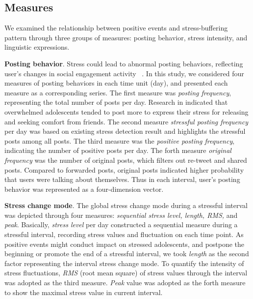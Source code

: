 \subsection{Measures}
\label{measures}
We examined the relationship
between positive events and stress-buffering pattern through three groups of measures:
posting behavior, stress intensity, and linguistic expressions.

\textbf{Posting behavior}.
Stress could lead to abnormal posting behaviors,
reflecting user's changes in social engagement activity ~\citep{Liang2015Teenagers}.
In this study,
we considered four measures of posting behaviors in each time unit (day),
and presented each measure as a corresponding series.
The first measure was \emph{posting frequency},
representing the total number of posts per day.
Research in \cite{Li2017Analyzing} indicated that overwhelmed adolescents tended to post more to express their stress for releasing
and seeking comfort from friends.
The second measure \emph{stressful posting frequency} per day
was based on existing stress detection result and highlights the stressful posts among all posts.
The third measure was the \emph{positive posting frequency}, indicating the number of positive posts per day.
The forth measure \emph{original frequency} was the number of original posts, which filters out re-tweet and shared posts.
Compared to forwarded posts, original posts indicated higher probability that users were talking about themselves.
Thus in each interval, user's posting behavior was represented as a four-dimension vector.

\textbf{Stress change mode}.
The global stress change mode during a stressful interval was depicted through four measures:
\emph{sequential stress level, length, RMS,} and \emph{peak}.
Basically, \emph{stress level} per day constructed a sequential measure during a stressful interval,
recording stress values and fluctuation on each time point.
As positive events might conduct impact on stressed adolescents,
and postpone the beginning or promote the end of a stressful interval,
we took \emph{length} as the second factor representing the interval stress change mode.
To quantify the intensity of stress fluctuations,
\emph{RMS} (root mean square) of stress values through the interval was adopted  as the third measure.
\emph{Peak} value was adopted as the forth measure to show the maximal stress value in current interval.

